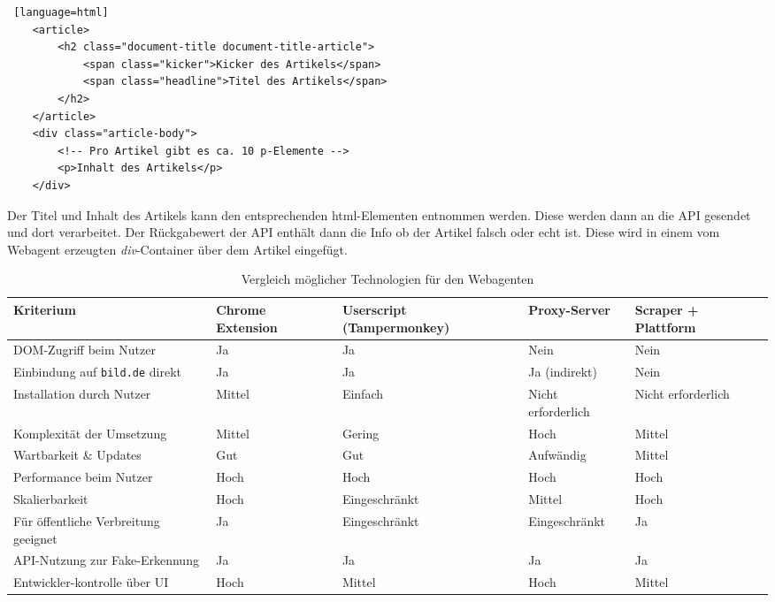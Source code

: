 \begin{lstlisting} [language=html]
    <article>
        <h2 class="document-title document-title-article">
            <span class="kicker">Kicker des Artikels</span>
            <span class="headline">Titel des Artikels</span>
        </h2>
    </article>
    <div class="article-body">
        <!-- Pro Artikel gibt es ca. 10 p-Elemente -->
        <p>Inhalt des Artikels</p>
    </div>
\end{lstlisting}

Der Titel und Inhalt des Artikels kann den entsprechenden html-Elementen entnommen werden.
Diese werden dann an die API gesendet und dort verarbeitet. 
Der Rückgabewert der API enthält dann die Info ob der Artikel falsch oder echt ist.
Diese wird in einem vom Webagent erzeugten \textit{div}-Container über dem Artikel eingefügt.

\begin{table}[ht]
    \centering
    \renewcommand{\arraystretch}{1.3}
    \begin{tabular}{|p{2.5cm}|p{2.5cm}|p{2.5cm}|p{2.5cm}|p{2.5cm}|}
        \hline
        \textbf{Kriterium} & \textbf{Chrome Extension} & \textbf{Userscript (Tampermonkey)} & \textbf{Proxy-Server} & \textbf{Scraper + Plattform} \\
        \hline
        DOM-Zugriff beim Nutzer & Ja & Ja & Nein & Nein \\
        \hline
        Einbindung auf \texttt{bild.de} direkt & Ja & Ja & Ja (indirekt) & Nein \\
        \hline
        Installation durch Nutzer & Mittel & Einfach & Nicht erforderlich & Nicht erforderlich\\
        \hline
        Komplexität der Umsetzung & Mittel & Gering & Hoch & Mittel \\
        \hline
        Wartbarkeit \& Updates & Gut & Gut & Aufwändig & Mittel \\
        \hline
        Performance beim Nutzer & Hoch & Hoch & Hoch & Hoch \\
        \hline
        Skalierbarkeit & Hoch & Eingeschränkt & Mittel & Hoch \\
        \hline
        Für öffentliche Verbreitung geeignet & Ja & Eingeschränkt & Eingeschränkt & Ja \\
        \hline
        API-Nutzung zur Fake-Erkennung & Ja & Ja & Ja & Ja \\
        \hline
        Entwickler-kontrolle über UI & Hoch & Mittel & Hoch & Mittel \\
        \hline
    \end{tabular}
    \caption{Vergleich möglicher Technologien für den Webagenten}
    \label{table:technischeAnsaetze}
\end{table} %

